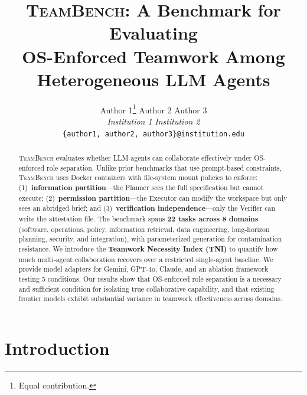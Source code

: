 \documentclass{article}
\newcommand{\teambench}{\textsc{TeamBench}}
\begin{document}
\title{%
  \teambench: A Benchmark for Evaluating\\
  OS-Enforced Teamwork Among Heterogeneous LLM Agents%
}

\author{%
  Author 1\thanks{Equal contribution.} \quad
  Author 2\footnotemark[1] \quad
  Author 3 \\[2pt]
  \textit{Institution 1} \quad \textit{Institution 2} \\[2pt]
  \texttt{\{author1, author2, author3\}@institution.edu}
}

\date{}
\maketitle

\begin{abstract}
\teambench{} evaluates whether LLM agents can collaborate effectively under
OS-enforced role separation. Unlike prior benchmarks that use prompt-based
constraints, \teambench{} uses Docker containers with file-system mount
policies to enforce: (1)~\textbf{information partition}---the Planner sees
the full specification but cannot execute; (2)~\textbf{permission
partition}---the Executor can modify the workspace but only sees an abridged
brief; and (3)~\textbf{verification independence}---only the Verifier can
write the attestation file. The benchmark spans \textbf{22 tasks across 8
domains} (software, operations, policy, information retrieval, data
engineering, long-horizon planning, security, and integration), with
parameterized generation for contamination resistance. We introduce the
\textbf{Teamwork Necessity Index (TNI)} to quantify how much multi-agent
collaboration recovers over a restricted single-agent baseline. We provide
model adapters for Gemini, GPT-4o, Claude, and an ablation framework testing
5 conditions. Our results show that OS-enforced role separation is a
necessary and sufficient condition for isolating true collaborative
capability, and that existing frontier models exhibit substantial variance in
teamwork effectiveness across domains.
\end{abstract}

\section{Introduction}
\label{sec:intro}
\end{document}

